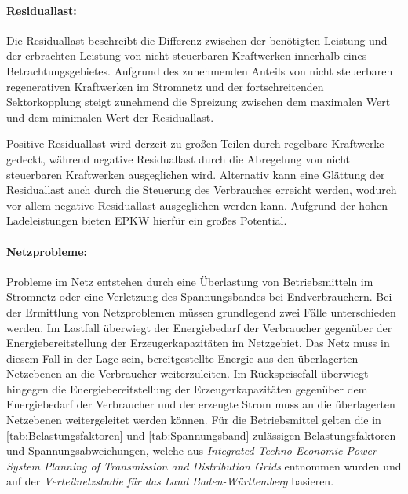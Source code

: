 \paragraph{Residuallast:}

Die Residuallast beschreibt die Differenz zwischen der benötigten Leistung und der erbrachten Leistung von nicht steuerbaren Kraftwerken innerhalb eines Betrachtungsgebietes.
Aufgrund des zunehmenden Anteils von nicht steuerbaren regenerativen Kraftwerken im Stromnetz und der fortschreitenden Sektorkopplung steigt zunehmend die Spreizung zwischen dem maximalen Wert und dem minimalen Wert der Residuallast.\medskip


Positive Residuallast wird derzeit zu großen Teilen durch regelbare Kraftwerke gedeckt, während negative Residuallast durch die Abregelung von nicht steuerbaren Kraftwerken ausgeglichen wird.
Alternativ kann eine Glättung der Residuallast auch durch die Steuerung des Verbrauches erreicht werden, wodurch vor allem negative Residuallast ausgeglichen werden kann.
Aufgrund der hohen Ladeleistungen bieten \gls{EPKW} hierfür ein großes Potential. \cite{Paschotta2020a}


\paragraph{Netzprobleme:}

Probleme im Netz entstehen durch eine Überlastung von Betriebsmitteln im Stromnetz oder eine Verletzung des Spannungsbandes bei Endverbrauchern.
Bei der Ermittlung von Netzproblemen müssen grundlegend zwei Fälle unterschieden werden.
Im Lastfall überwiegt der Energiebedarf der Verbraucher gegenüber der Energiebereitstellung der Erzeugerkapazitäten im Netzgebiet.
Das Netz muss in diesem Fall in der Lage sein, bereitgestellte Energie aus den überlagerten Netzebenen an die Verbraucher weiterzuleiten.
Im Rückspeisefall überwiegt hingegen die Energiebereitstellung der Erzeugerkapazitäten gegenüber dem Energiebedarf der Verbraucher und der erzeugte Strom muss an die überlagerten Netzebenen weitergeleitet werden können. \cite{Agora2019}
Für die Betriebsmittel gelten die in \autoref{tab:Belastungsfaktoren} und \autoref{tab:Spannungsband} zulässigen Belastungsfaktoren und Spannungsabweichungen, welche aus \textit{Integrated Techno-Economic Power System Planning of Transmission and Distribution Grids} \cite{Mueller2019a} entnommen wurden und auf der \textit{Verteilnetzstudie für das Land Baden-Württemberg} \cite{Rehtanz2017} basieren.


